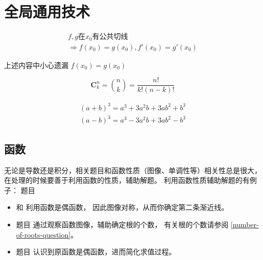 \chapter{全局通用技术}

\begin{lemma}
\begin{multline*}
	f, g \mbox{在} x_0 \mbox{有公共切线} \\ \Rightarrow f(x_0) = g(x_0), f'(x_0) = g'(x_0)
\end{multline*}
\end{lemma}
上述内容中小心遗漏 $f(x_0) = g(x_0)$

\begin{definition}
    \begin{equation}
        \mathbf{C}_{k}^{n} = \binom{n}{k} = \frac{n!}{k!(n-k)!}
    \end{equation}
\end{definition}

\begin{lemma}
    \begin{align*}
        (a+b)^3 = a^3 + 3a^2b + 3ab^2 + b^3\\
        (a-b)^3 = a^3 - 3a^2b + 3ab^2 - b^3
    \end{align*}
\end{lemma}

\section{函数}

无论是导数还是积分，相关题目和函数性质（图像、单调性等）相关性总是很大，
在处理的时候要善于利用函数的性质，辅助解题。
利用函数性质辅助解题的有例子：
题目 
\begin{itemize}

    \item   \cite[page 70, pdf 81, 例1]{we} 和 
            \cite[page 75, pdf 86, 例6]{we}利用函数是偶函数，
            因此图像对称，从而你确定第二条渐近线。

    \item   题目 \cite[page 77, pdf 88, 例5, 例6]{we} 
            通过观察函数图像，辅助确定根的个数，
            有关根的个数请参阅 \ref{number-of-roots-question}。

    \item   题目 \cite[page 107, pdf 118, example 4]{we}
            认识到原函数是偶函数，进而简化求值过程。

\end{itemize}

